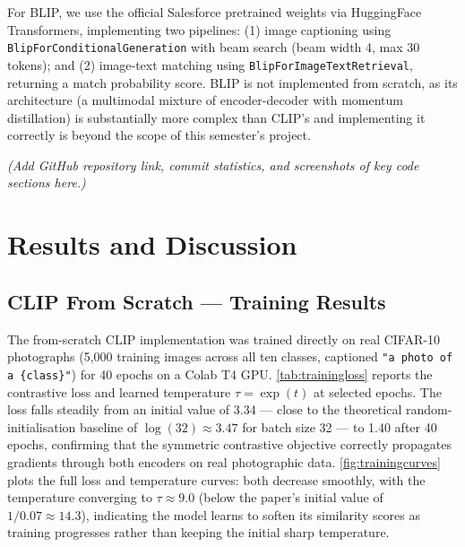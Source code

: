 \documentclass{iutbscthesis}
\begin{document}
For BLIP, we use the official Salesforce pretrained weights via HuggingFace Transformers, implementing two pipelines: (1) image captioning using \texttt{BlipForConditionalGeneration} with beam search (beam width 4, max 30 tokens); and (2) image-text matching using \texttt{BlipForImageTextRetrieval}, returning a match probability score. BLIP is not implemented from scratch, as its architecture (a multimodal mixture of encoder-decoder with momentum distillation) is substantially more complex than CLIP's and implementing it correctly is beyond the scope of this semester's project.

\textit{(Add GitHub repository link, commit statistics, and screenshots of key code sections here.)}

\chapter{Results and Discussion} \label{chapter:results}

\section{CLIP From Scratch --- Training Results} \label{sec:trainingresults}

The from-scratch CLIP implementation was trained directly on real CIFAR-10 photographs (5{,}000 training images across all ten classes, captioned \texttt{"a photo of a \{class\}"}) for 40 epochs on a Colab T4 GPU. \autoref{tab:trainingloss} reports the contrastive loss and learned temperature $\tau = \exp(t)$ at selected epochs. The loss falls steadily from an initial value of 3.34 --- close to the theoretical random-initialisation baseline of $\log(32) \approx 3.47$ for batch size 32 --- to 1.40 after 40 epochs, confirming that the symmetric contrastive objective correctly propagates gradients through both encoders on real photographic data. \autoref{fig:trainingcurves} plots the full loss and temperature curves: both decrease smoothly, with the temperature converging to $\tau \approx 9.0$ (below the paper's initial value of $1/0.07 \approx 14.3$), indicating the model learns to soften its similarity scores as training progresses rather than keeping the initial sharp temperature.
\end{document}
